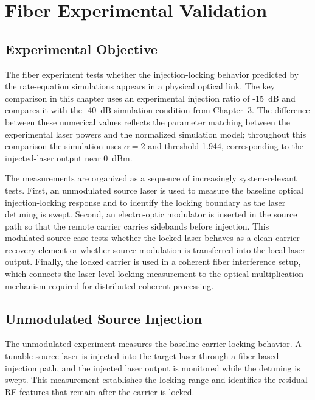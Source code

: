 \chapter{Fiber Experimental Validation}

\section{Experimental Objective}

The fiber experiment tests whether the injection-locking behavior predicted by the rate-equation simulations appears in a physical optical link. The key comparison in this chapter uses an experimental injection ratio of -15~dB and compares it with the -40~dB simulation condition from Chapter~3. The difference between these numerical values reflects the parameter matching between the experimental laser powers and the normalized simulation model; throughout this comparison the simulation uses $\alpha=2$ and threshold 1.944, corresponding to the injected-laser output near 0~dBm.

The measurements are organized as a sequence of increasingly system-relevant tests. First, an unmodulated source laser is used to measure the baseline optical injection-locking response and to identify the locking boundary as the laser detuning is swept. Second, an electro-optic modulator is inserted in the source path so that the remote carrier carries sidebands before injection. This modulated-source case tests whether the locked laser behaves as a clean carrier recovery element or whether source modulation is transferred into the local laser output. Finally, the locked carrier is used in a coherent fiber interference setup, which connects the laser-level locking measurement to the optical multiplication mechanism required for distributed coherent processing.

\section{Unmodulated Source Injection}

The unmodulated experiment measures the baseline carrier-locking behavior. A tunable source laser is injected into the target laser through a fiber-based injection path, and the injected laser output is monitored while the detuning is swept. This measurement establishes the locking range and identifies the residual RF features that remain after the carrier is locked.

